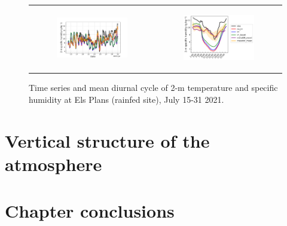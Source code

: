 \begin{figure}[hbtp]
\begin{tabular}{cc}
        \begin{subfigure}[t]{0.5\textwidth}
            \caption{}
            \includegraphics[width=\textwidth]{images/chap5/time_series_elsplans_q2m.png}
        \end{subfigure} &
        \begin{subfigure}[t]{0.5\textwidth}
            \caption{}
            \includegraphics[width=\textwidth]{images/chap5/diurnal_cycle_elsplans_q2m.png}
        \end{subfigure} \\
    \end{tabular}
    \caption{Time series and mean diurnal cycle of 2-m temperature and specific humidity at Els Plans (rainfed site), July 15-31 2021.}
\end{figure}

\clearpage

\section{Vertical structure of the atmosphere}

\clearpage

\section{Chapter conclusions}